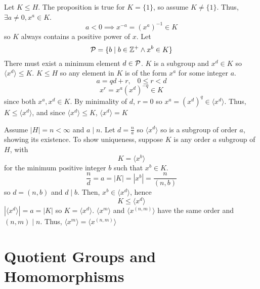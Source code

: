 \documentclass{report}
\newenvironment{myproof}[1][\proofname]{%
	\proof[\bfseries #1: ]%
}{\endproof}
\begin{document}
\begin{myproof}
    Let $K \leq H$. The proposition is true for $K = \{1\}$, so assume $K \neq \{1\}$. Thus, $\exists a \neq 0, x^a \in K$. 
    $$a < 0 \implies x^{-a} = (x^a)^{-1} \in K$$
    so $K$ always contains a positive power of $x$. Let 
    $$\mathcal{P} = \{ b \mid b \in \mathbb{Z}^+ \land x^b \in K \}$$
    There must exist a minimum element $d \in \mathcal{P}$. $K$ is a subgroup and $x^d \in K$ so $\langle x^d \rangle \leq K$. $K \leq H$ so any element in $K$ is of the form $x^a$ for some integer $a$. 
    $$a = qd + r, \hspace{10pt} 0 \leq r < d$$
    $$x^r = x^a (x^d) ^{-q} \in K$$
    since both $x^a, x^d \in K$. By minimality of $d$, $r = 0$ so $x^a = (x^d)^q \in \langle x^d \rangle$. Thus, $K \leq \langle x^d \rangle$, and since $\langle x^d \rangle\leq K$,  $\langle x^d \rangle = K$

    Assume $|H| = n < \infty$ and $a \mid n$. Let $d = \frac{n}{a}$ so $\langle x^d \rangle$ so is a subgroup of order $a$, showing its existence. To show uniqueness, suppose $K$ is any order $a$ subgroup of $H$, with 
    $$K = \langle x^b \rangle$$
    for the minimum positive integer $b$ such that $x^b \in K$. 
    $$\frac{n}{d} = a = |K| = |x^b| = \frac{n}{(n,b)}$$
    so $d = (n,b)$ and $d \mid b$. Then, $x^b \in \langle x^d \rangle$, hence 
    $$K \leq \langle x^d \rangle$$
    $| \langle x^d \rangle | = a = |K|$ so $K = \langle x^d \rangle$. $\langle x^m \rangle$ and $\langle x^{(n,m)} \rangle $ have the same order and $(n, m) \mid n$. Thus, $\langle x^m \rangle = \langle x^{(n,m)} \rangle$
\end{myproof}
\chapter{Quotient Groups and Homomorphisms}
\end{document}
